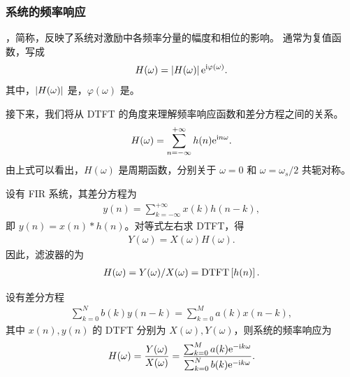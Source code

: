 \subsubsection{系统的频率响应}

\begin{definition}[系统的频率响应]
    ，简称，反映了系统对激励中各频率分量的幅度和相位的影响。
    通常为复值函数，写成
    \begin{align*}
        H(\omega) = \left|H(\omega)\right|\mathrm{e}^{\mathrm{i} \varphi(\omega)}.
    \end{align*}
    其中，$\left|H(\omega)\right|$ 是，$\varphi(\omega)$ 是。
    
    接下来，我们将从 DTFT 的角度来理解频率响应函数和差分方程之间的关系。
    \begin{align*}
        H(\omega) = \sum_{n = -\infty}^{+\infty}h(n)\mathrm{e}^{\mathrm{i} n \omega}.
    \end{align*}
    由上式可以看出，$H(\omega)$ 是周期函数，分别关于 $\omega = 0$ 和 $\omega = \omega_s/2$ 共轭对称。
\end{definition}

\begin{example}
    设有 FIR 系统，其差分方程为
    \begin{align*}
        y(n) = \sum_{k = -\infty}^{+\infty}x(k)h(n - k),
    \end{align*}
    即 $y(n) = x(n) * h(n)$。对等式左右求 DTFT，得
    \begin{align*}
        Y(\omega) = X(\omega) H(\omega).
    \end{align*}
    因此，滤波器的为
    \begin{align*}
        H(\omega) = Y(\omega) / X(\omega) = \mathrm{DTFT}\left[h(n)\right].
    \end{align*}
\end{example}

\begin{theorem}[频率响应与差分方程]
    设有差分方程
    \begin{align*}
        \sum_{k = 0}^{N}b(k)y(n - k) = \sum_{k = 0}^{M}a(k)x(n - k),
    \end{align*}
    其中 $x(n), y(n)$ 的 DTFT 分别为 $X(\omega), Y(\omega)$，则系统的频率响应为
    \begin{align*}
        H(\omega) = \frac{Y(\omega)}{X(\omega)} = \frac{\sum_{k = 0}^{M}a(k)\mathrm{e}^{-\mathrm{i} k \omega}}{\sum_{k = 0}^{N}b(k)\mathrm{e}^{-\mathrm{i} k \omega}}.
    \end{align*}
\end{theorem}

